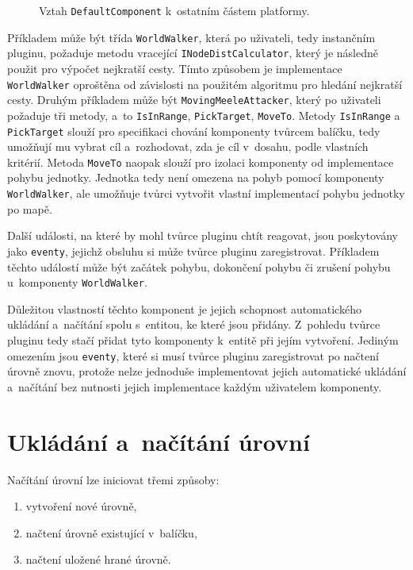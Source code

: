 \begin{figure}[h]
	\centering
	\fontsize{8pt}{11pt}\selectfont
	\def\svgwidth{\textwidth}
	
	\caption{Vztah \texttt{DefaultComponent} k~ostatním částem platformy.}
	\label{fig:defaultcomponentstructure}
\end{figure}


Příkladem může být třída \texttt{WorldWalker}, která po uživateli, tedy instančním pluginu, požaduje metodu vracející \texttt{INodeDistCalculator}, který je následně použit pro výpočet nejkratší cesty. Tímto způsobem je implementace \texttt{WorldWalker} oproštěna od závislosti na použitém algoritmu pro hledání nejkratší cesty. Druhým příkladem může být \texttt{MovingMeeleAttacker}, který po uživateli požaduje tři metody, a~to \texttt{IsInRange}, \texttt{PickTarget}, \texttt{MoveTo}. Metody \texttt{IsInRange} a \texttt{PickTarget} slouží pro specifikaci chování komponenty tvůrcem balíčku, tedy umožňují mu vybrat cíl a~rozhodovat, zda je cíl v~dosahu, podle vlastních kritérií. Metoda \texttt{MoveTo} naopak slouží pro izolaci komponenty od implementace pohybu jednotky. Jednotka tedy není omezena na pohyb pomocí komponenty \texttt{WorldWalker}, ale umožňuje tvůrci vytvořit vlastní implementací pohybu jednotky po mapě.

Další události, na které by mohl tvůrce pluginu chtít reagovat, jsou poskytovány jako \texttt{eventy}, jejichž obsluhu si může tvůrce pluginu zaregistrovat. Příkladem těchto událostí může být začátek pohybu, dokončení pohybu či zrušení pohybu u~komponenty \texttt{WorldWalker}.

Důležitou vlastností těchto komponent je jejich schopnost automatického ukládání a~načítání spolu s~entitou, ke které jsou přidány. Z~pohledu tvůrce pluginu tedy stačí přidat tyto komponenty k~entitě při jejím vytvoření. Jediným omezením jsou \texttt{eventy}, které si musí tvůrce pluginu zaregistrovat po načtení úrovně znovu, protože nelze jednoduše implementovat jejich automatické ukládání a~načítání bez nutnosti jejich implementace každým uživatelem komponenty. 

\section{Ukládání a~načítání úrovní}
\label{sec:loading}

Načítání úrovní lze iniciovat třemi způsoby:
\begin{enumerate}
	\item vytvoření nové úrovně,
	\item načtení úrovně existující v~balíčku,
	\item načtení uložené hrané úrovně.
\end{enumerate}

